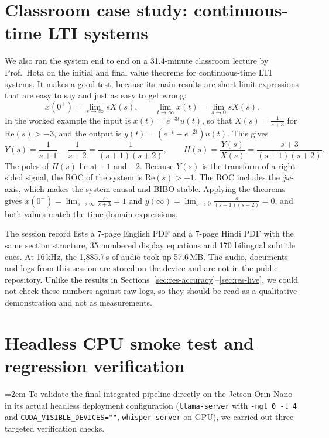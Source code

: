 \documentclass[11pt,a4paper,oneside]{report}
\theoremstyle{definition}
\newcommand{\code}[1]{\texttt{\small #1}}
\begin{document}
\section{Classroom case study: continuous-time LTI systems}
\label{sec:case}
We also ran the system end to end on a 31.4-minute classroom lecture by Prof.\ Hota on the initial and final value theorems for continuous-time LTI systems. It makes a good test, because its main results are short limit expressions that are easy to say and just as easy to get wrong:
\begin{equation}
  x(0^{+}) = \lim_{s\to\infty} sX(s), \qquad \lim_{t\to\infty} x(t) = \lim_{s\to0} sX(s).
\end{equation}
In the worked example the input is $x(t)=e^{-3t}u(t)$, so that $X(s)=\frac{1}{s+3}$ for $\mathrm{Re}(s)>-3$, and the output is $y(t)=(e^{-t}-e^{-2t})u(t)$. This gives
\begin{equation}
  Y(s) = \frac{1}{s+1}-\frac{1}{s+2} = \frac{1}{(s+1)(s+2)}, \qquad
  H(s) = \frac{Y(s)}{X(s)} = \frac{s+3}{(s+1)(s+2)}.
\end{equation}
The poles of $H(s)$ lie at $-1$ and $-2$. Because $Y(s)$ is the transform of a right-sided signal, the ROC of the system is $\mathrm{Re}(s)>-1$. The ROC includes the $j\omega$-axis, which makes the system causal and BIBO stable. Applying the theorems gives $x(0^{+}) = \lim_{s\to\infty} \frac{s}{s+3} = 1$ and $y(\infty) = \lim_{s\to0} \frac{s}{(s+1)(s+2)} = 0$, and both values match the time-domain expressions.

The session record lists a 7-page English PDF and a 7-page Hindi PDF with the same section structure, 35 numbered display equations and 170 bilingual subtitle cues. At 16\,kHz, the 1{,}885.7\,s of audio took up 57.6\,MB. The audio, documents and logs from this session are stored on the device and are not in the public repository. Unlike the results in Sections~\ref{sec:res-accuracy}--\ref{sec:res-live}, we could not check these numbers against raw logs, so they should be read as a qualitative demonstration and not as measurements.

\section{Headless CPU smoke test and regression verification}
\label{sec:smoke}
\begingroup\emergencystretch=2em
To validate the final integrated pipeline directly on the Jetson Orin Nano in its actual headless deployment configuration (\texttt{llama-server} with \code{-ngl 0 -t 4} and \code{CUDA\_VISIBLE\_DEVICES=""}, \texttt{whisper-server} on GPU), we carried out three targeted verification checks.
\end{document}
